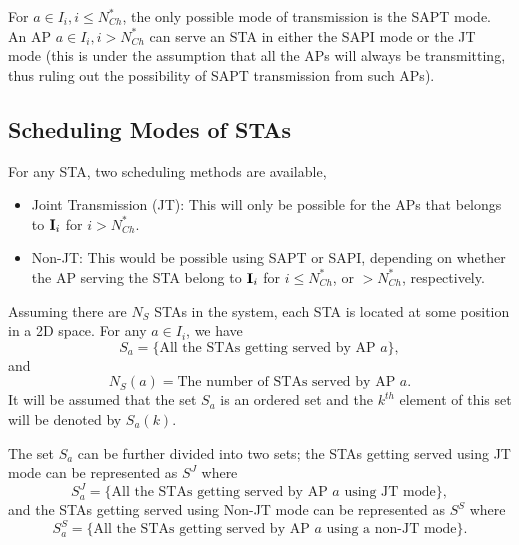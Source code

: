 For $a\in I_i, i\leq N_{Ch}^*$, the only possible mode of transmission is the SAPT mode. An AP $a\in I_i, i> N_{Ch}^*$ can serve an STA in either the SAPI mode or the JT mode (this is under the assumption that all the APs will always be transmitting, thus ruling out the possibility of SAPT transmission from such APs).





\subsection{Scheduling Modes of STAs}
\label{subsec:schedulingModesOfSTAs}
For any STA, two scheduling methods are available, 
\begin{itemize}
    \item Joint Transmission (JT): This will only be possible for the APs that belongs to $\mathbf{I}_i$ for $i > N_{Ch}^*$.
    
    \item Non-JT: This would be possible using SAPT or SAPI, depending on whether the AP serving the STA belong to $\mathbf{I}_i$ for $i \leq N_{Ch}^*$, or $ > N_{Ch}^*$, respectively.
\end{itemize}

Assuming there are $N_S$ STAs in the system, each STA is located at some position in a 2D space.
For any $a \in I_i$, we have
$$S_a = \{\text{All the STAs getting served by AP } a \},$$
and
$$N_S(a) = \text{The number of STAs served by AP } a.$$
It will be assumed that the set $S_a$ is an ordered set and the $k^{th}$ element of this set will be denoted by $S_a(k)$.

The set $S_a$ can be further divided into two sets; the STAs getting served using JT mode can be represented as $S^J$ where
\begin{equation*}
    S_a^J = \{\text{All the STAs getting served by AP } a \text{ using JT mode}\},
\end{equation*}
and the STAs getting served using Non-JT mode can be represented as $S^S$ where
\begin{equation*}
    S_a^S = \{\text{All the STAs getting served by AP } a \text{ using a non-JT mode}\}.
\end{equation*}

